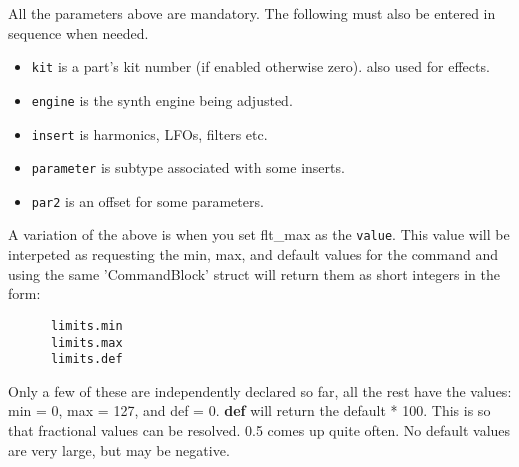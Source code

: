    All the parameters above are mandatory. The following must also be entered in
   sequence when needed.

   \begin{itemize}
      \item \texttt{kit} is a part's kit number (if enabled otherwise zero).
         also used for effects.
      \item \texttt{engine} is the synth engine being adjusted.
      \item \texttt{insert} is harmonics, LFOs, filters etc.
      \item \texttt{parameter} is subtype associated with some inserts.
      \item \texttt{par2} is an offset for some parameters.
   \end{itemize}

   A variation of the above is when you set flt\_max as the \texttt{value}.
   This value will
   be interpeted as requesting the min, max, and default values for the
   command and using the same 'CommandBlock' struct will return them as short
   integers in the form:

   \begin{verbatim}
      limits.min
      limits.max
      limits.def
   \end{verbatim}

   Only a few of these are independently declared so far, all the rest have the
   values: min = 0, max = 127, and def = 0.  \textbf{def} will return the
   default * 100. This is so that fractional values can be resolved. 0.5 comes
   up quite often. No default values are very large, but may be negative.

